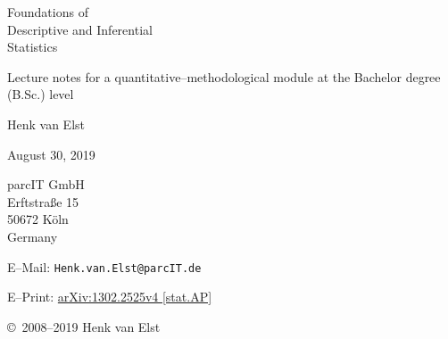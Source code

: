 \documentclass[a4paper,12pt,twoside]{book}
\begin{document}

\vspace*{1cm}
\begin{center}
{\Huge\sc
                    Foundations of \\
                    Descriptive and Inferential \\
                    Statistics
\par}
\par\vfill\vfill\vfill
              Lecture notes for a quantitative–methodological
							module at the Bachelor degree (B.Sc.) level
\par\vfill
\par\vfill
 
\par\vfill\vfill\vfill\vfill

                    {\large\sc Henk van Elst}

\par\vfill

                 August 30, 2019
\par\vfill\vfill

                 parcIT GmbH \\
								 Erftstra\ss e 15 \\
								 50672 K\"{o}ln \\
                 Germany
\par\vfill
                 E--Mail: \texttt{Henk.van.Elst@parcIT.de}
\par\vfill\vfill
                 E--Print: 
\href{http://arxiv.org/abs/1302.2525}{arXiv:1302.2525v4 [stat.AP]}
\par\vfill\vfill
								 \copyright\ 2008--2019 Henk van Elst 
\end{center}
\vspace*{1cm}
\sloppy
      \renewcommand{\thepage}{}                 %

      \newpage \thispagestyle{empty}
\tableofcontents
      \newpage \thispagestyle{empty}
      \cleardoublepage {}





















\end{document}
